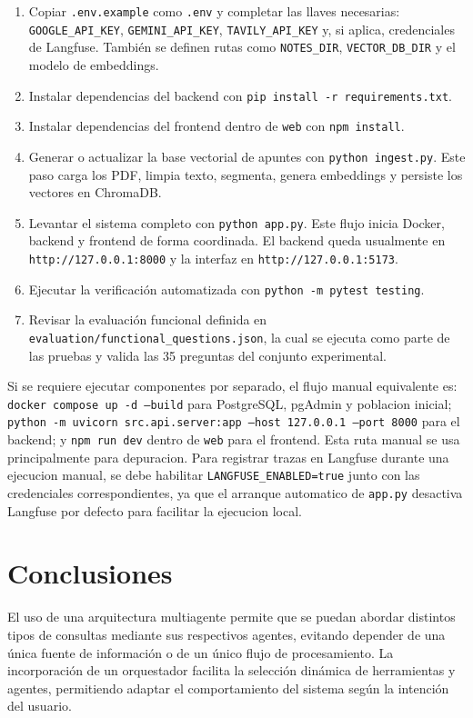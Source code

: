 \documentclass[conference]{IEEEtran}
\begin{document}
\begin{enumerate}
    \item Copiar \texttt{.env.example} como \texttt{.env} y completar las llaves necesarias: \texttt{GOOGLE\_API\_KEY}, \texttt{GEMINI\_API\_KEY}, \texttt{TAVILY\_API\_KEY} y, si aplica, credenciales de Langfuse. También se definen rutas como \texttt{NOTES\_DIR}, \texttt{VECTOR\_DB\_DIR} y el modelo de embeddings.
    \item Instalar dependencias del backend con \texttt{pip install -r requirements.txt}.
    \item Instalar dependencias del frontend dentro de \texttt{web} con \texttt{npm install}.
    \item Generar o actualizar la base vectorial de apuntes con \texttt{python ingest.py}. Este paso carga los PDF, limpia texto, segmenta, genera embeddings y persiste los vectores en ChromaDB.
    \item Levantar el sistema completo con \texttt{python app.py}. Este flujo inicia Docker, backend y frontend de forma coordinada. El backend queda usualmente en \texttt{http://127.0.0.1:8000} y la interfaz en \texttt{http://127.0.0.1:5173}.
    \item Ejecutar la verificación automatizada con \texttt{python -m pytest testing}.
    \item Revisar la evaluación funcional definida en \texttt{evaluation/functional\_questions.json}, la cual se ejecuta como parte de las pruebas y valida las 35 preguntas del conjunto experimental.
\end{enumerate}

Si se requiere ejecutar componentes por separado, el flujo manual equivalente es: \texttt{docker compose up -d --build} para PostgreSQL, pgAdmin y poblacion inicial; \texttt{python -m uvicorn src.api.server:app --host 127.0.0.1 --port 8000} para el backend; y \texttt{npm run dev} dentro de \texttt{web} para el frontend. Esta ruta manual se usa principalmente para depuracion. Para registrar trazas en Langfuse durante una ejecucion manual, se debe habilitar \texttt{LANGFUSE\_ENABLED=true} junto con las credenciales correspondientes, ya que el arranque automatico de \texttt{app.py} desactiva Langfuse por defecto para facilitar la ejecucion local.

\section{Conclusiones}

El uso de una arquitectura multiagente permite que se puedan abordar distintos tipos de consultas mediante sus respectivos agentes, evitando depender de una única fuente de información o de un único flujo de procesamiento. La incorporación de un orquestador facilita la selección dinámica de herramientas y agentes, permitiendo adaptar el comportamiento del sistema según la intención del usuario.
\end{document}

